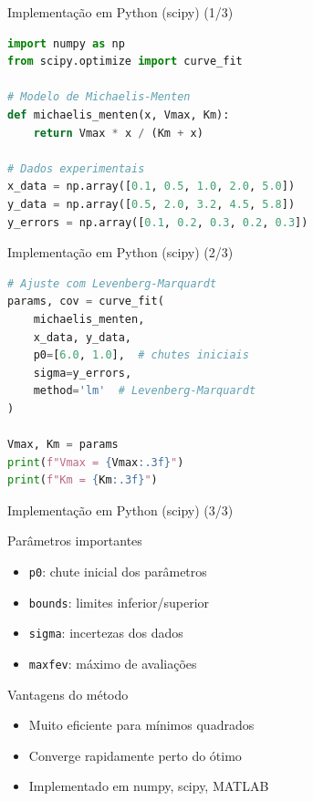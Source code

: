 \begin{frame}[fragile]{Implementação em Python (scipy) (1/3)}
\begin{lstlisting}[language=Python, caption=Ajuste Michaelis-Menten (Definição e Dados), basicstyle=\ttfamily\scriptsize]
import numpy as np
from scipy.optimize import curve_fit

# Modelo de Michaelis-Menten
def michaelis_menten(x, Vmax, Km):
    return Vmax * x / (Km + x)

# Dados experimentais
x_data = np.array([0.1, 0.5, 1.0, 2.0, 5.0])
y_data = np.array([0.5, 2.0, 3.2, 4.5, 5.8])
y_errors = np.array([0.1, 0.2, 0.3, 0.2, 0.3])
\end{lstlisting}
\end{frame}

\begin{frame}[fragile]{Implementação em Python (scipy) (2/3)}
\begin{lstlisting}[language=Python, caption=Ajuste Michaelis-Menten (Fitting e Resultados), basicstyle=\ttfamily\scriptsize]
# Ajuste com Levenberg-Marquardt
params, cov = curve_fit(
    michaelis_menten,
    x_data, y_data,
    p0=[6.0, 1.0],  # chutes iniciais
    sigma=y_errors,
    method='lm'  # Levenberg-Marquardt
)

Vmax, Km = params
print(f"Vmax = {Vmax:.3f}")
print(f"Km = {Km:.3f}")
\end{lstlisting}
\end{frame}

\begin{frame}{Implementação em Python (scipy) (3/3)}
\begin{block}{Parâmetros importantes}
\begin{itemize}
    \item \texttt{p0}: chute inicial dos parâmetros
    \item \texttt{bounds}: limites inferior/superior
    \item \texttt{sigma}: incertezas dos dados
    \item \texttt{maxfev}: máximo de avaliações
\end{itemize}
\end{block}

\vspace{0.3cm}
\begin{block}{Vantagens do método}
\begin{itemize}
    \item Muito eficiente para mínimos quadrados
    \item Converge rapidamente perto do ótimo
    \item Implementado em numpy, scipy, MATLAB
\end{itemize}
\end{block}
\end{frame}

